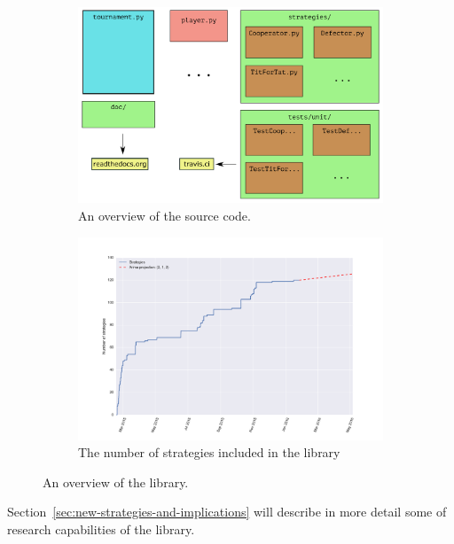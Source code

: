 \documentclass{article}
\begin{document}
\begin{figure}[!hbtp]
	\begin{subfigure}{.5\textwidth}
		\centering
		\includegraphics[width=\textwidth]{../img/outline_of_library.pdf}
		\caption{An overview of the source code.}
		\label{fig:overview}
	\end{subfigure}
	\begin{subfigure}{.5\textwidth}
		\centering
		\includegraphics[width=\textwidth]{../img/number_of_strategies_with_arima_projection.pdf}
		\caption{The number of strategies included in the library}
		\label{fig:number_of_strategies_against_date}
	\end{subfigure}
	\caption{An overview of the library.}
\end{figure}

Section~\ref{sec:new-strategies-and-implications} will describe in more detail
some of research capabilities of the library.
\end{document}
